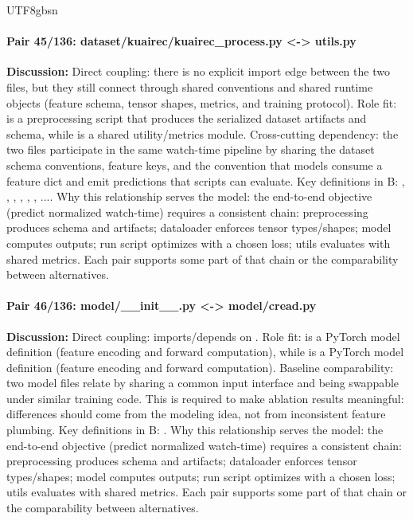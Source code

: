 \documentclass[11pt]{article}
\begin{document}
\begin{CJK*}{UTF8}{gbsn}
\paragraph{Pair 45/136: dataset/kuairec/kuairec\_process.py <-> utils.py}
\textbf{Discussion:} Direct coupling: there is no explicit import edge between the two files, but they still connect through shared conventions and shared runtime objects (feature schema, tensor shapes, metrics, and training protocol). Role fit: \texttt{} is a preprocessing script that produces the serialized dataset artifacts and schema, while \texttt{} is a shared utility/metrics module. Cross-cutting dependency: the two files participate in the same watch-time pipeline by sharing the dataset schema conventions, feature keys, and the convention that models consume a feature dict and emit predictions that scripts can evaluate. Key definitions in B: \texttt{}, \texttt{}, \texttt{}, \texttt{}, \texttt{}, \texttt{}, .... Why this relationship serves the model: the end-to-end objective (predict normalized watch-time) requires a consistent chain: preprocessing produces schema and artifacts; dataloader enforces tensor types/shapes; model computes outputs; run script optimizes with a chosen loss; utils evaluates with shared metrics. Each pair supports some part of that chain or the comparability between alternatives.

\paragraph{Pair 46/136: model/\_\_init\_\_.py <-> model/cread.py}
\textbf{Discussion:} Direct coupling: \texttt{} imports/depends on \texttt{}. Role fit: \texttt{} is a PyTorch model definition (feature encoding and forward computation), while \texttt{} is a PyTorch model definition (feature encoding and forward computation). Baseline comparability: two model files relate by sharing a common input interface and being swappable under similar training code. This is required to make ablation results meaningful: differences should come from the modeling idea, not from inconsistent feature plumbing. Key definitions in B: \texttt{}. Why this relationship serves the model: the end-to-end objective (predict normalized watch-time) requires a consistent chain: preprocessing produces schema and artifacts; dataloader enforces tensor types/shapes; model computes outputs; run script optimizes with a chosen loss; utils evaluates with shared metrics. Each pair supports some part of that chain or the comparability between alternatives.


\end{CJK*}
\end{document}
